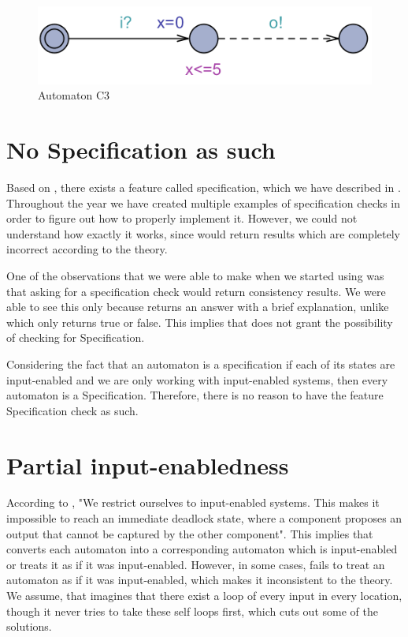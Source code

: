 \begin{figure}
    \centering
    \includegraphics[scale = 0.7]{figures/selfRefHold.png}
    \caption{Automaton C3}
    \label{fig:selfRefHold}
\end{figure}

\section{No Specification as such}\label{sec:specification}
Based on \textcite{David:2010}, there exists a feature called specification, which we have described in \textcite{Jecdar:2019}. Throughout the year we have created multiple examples of specification checks in order to figure out how to properly implement it. However, we could not understand how exactly it works, since  would return results which are completely incorrect according to the theory.

One of the observations that we were able to make when we started using  was that asking for a specification check would return consistency results. We were able to see this only because  returns an answer with a brief explanation, unlike  which only returns true or false. This implies that \ecdar does not grant the possibility of checking for Specification.

Considering the fact that an automaton is a specification if each of its states are input-enabled and we are only working with input-enabled systems, then every automaton is a Specification. Therefore, there is no reason to have the feature Specification check as such.


\section{Partial input-enabledness}\label{sec:input-enabledness}
According to \textcite{David:2010}, "We restrict ourselves to input-enabled systems. This makes it impossible to reach an immediate deadlock state, where a component proposes an output that cannot be captured by the other component". This implies that \ecdar converts each automaton into a corresponding automaton which is input-enabled or treats it as if it was input-enabled. However, in some cases, \ecdar fails to treat an automaton as if it was input-enabled, which makes it inconsistent to the theory. We assume, that \ecdar imagines that there exist a loop of every input in every location, though it never tries to take these self loops first, which cuts out some of the solutions. 

